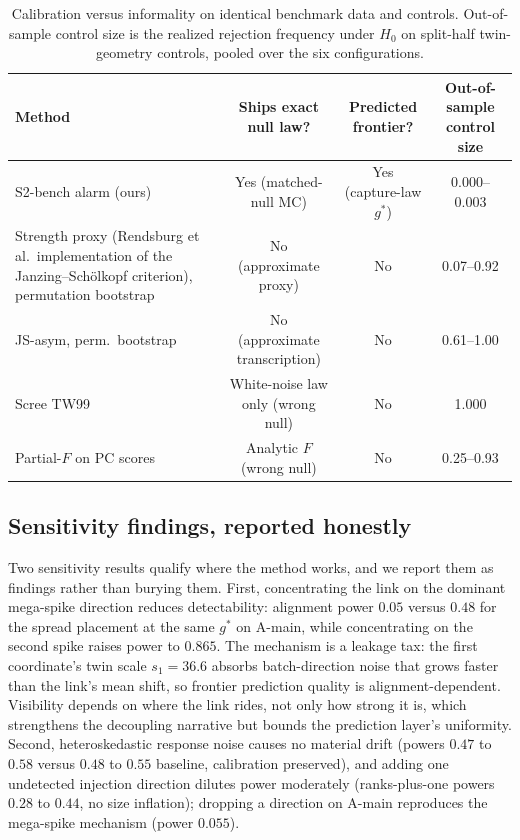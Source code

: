 \begin{table}[t]
\centering
\caption{Calibration versus informality on identical benchmark data and controls. Out-of-sample control size is the realized rejection frequency under $H_0$ on split-half twin-geometry controls, pooled over the six configurations.}
\label{tab:calib}
\begin{tabular}{lccc}
\toprule
Method & Ships exact null law? & Predicted frontier? & Out-of-sample control size \\
\midrule
S2-bench alarm (ours) & Yes (matched-null MC) & Yes (capture-law $g^*$) & 0.000--0.003 \\
Strength proxy (Rendsburg et al.\ implementation of the Janzing--Sch{\"o}lkopf criterion), permutation bootstrap \citep{rendsburg2024consistent,janzing2018detecting} & No (approximate proxy) & No & 0.07--0.92 \\
JS-asym, perm.\ bootstrap & No (approximate transcription) & No & 0.61--1.00 \\
Scree TW99 & White-noise law only (wrong null) & No & 1.000 \\
Partial-$F$ on PC scores & Analytic $F$ (wrong null) & No & 0.25--0.93 \\
\bottomrule
\end{tabular}
\end{table}

\subsection*{Sensitivity findings, reported honestly}

Two sensitivity results qualify where the method works, and we report them as findings rather than burying them. First, concentrating the link on the dominant mega-spike direction reduces detectability: alignment power $0.05$ versus $0.48$ for the spread placement at the same $g^*$ on A-main, while concentrating on the second spike raises power to $0.865$. The mechanism is a leakage tax: the first coordinate's twin scale $s_1 = 36.6$ absorbs batch-direction noise that grows faster than the link's mean shift, so frontier prediction quality is alignment-dependent. Visibility depends on where the link rides, not only how strong it is, which strengthens the decoupling narrative but bounds the prediction layer's uniformity. Second, heteroskedastic response noise causes no material drift (powers $0.47$ to $0.58$ versus $0.48$ to $0.55$ baseline, calibration preserved), and adding one undetected injection direction dilutes power moderately (ranks-plus-one powers $0.28$ to $0.44$, no size inflation); dropping a direction on A-main reproduces the mega-spike mechanism (power $0.055$).

